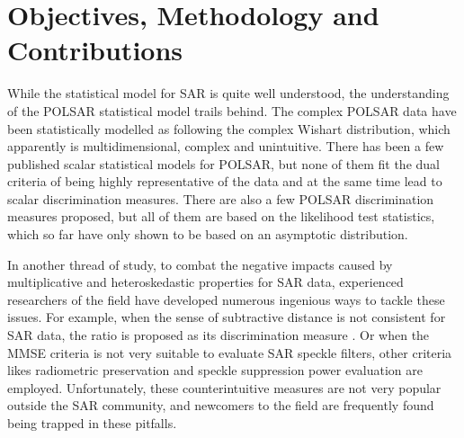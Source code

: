 \section{Objectives, Methodology and Contributions}


While
                the statistical model for SAR is quite well understood,
the
                understanding of the POLSAR statistical model trails behind.
The
                complex POLSAR data have been statistically modelled as
                following the complex Wishart distribution, which
                apparently is multi­dimensional, complex and
                un­intuitive.
There
                has been a few published scalar statistical models for
                POLSAR, but none of them fit the dual criteria of being
                highly representative of the data and at the same time
                lead to scalar discrimination measures.
There
                are also a few POLSAR discrimination measures proposed,
                but all of them are based on the likelihood test
                statistics, which so far have only shown to be based on an
                asymptotic distribution.

 In
                another thread of study, to combat the negative
                impacts caused by multiplicative and heteroskedastic
                properties for SAR data, experienced researchers of the
                field have developed numerous ingenious ways to tackle
                these issues.
For
                example, when the sense of subtractive distance is not
                consistent for SAR data, the ratio is proposed as its
                discrimination measure \cite{Rignot_1993_TGRS_896}.
Or
                when the MMSE criteria is not very suitable to evaluate
                SAR speckle filters, other criteria likes radiometric
                preservation and speckle suppression power evaluation
                are employed. 
Unfortunately,
                these counter­intuitive measures are not very popular
                outside the SAR community, and newcomers to the field
                are frequently found being trapped in these pitfalls.

